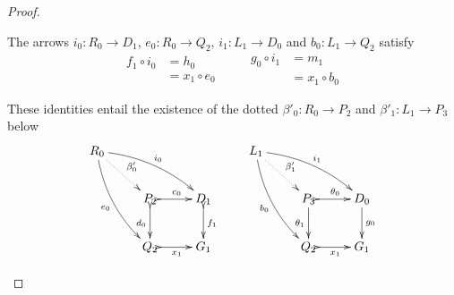 \begin{proof}
\begin{enumerate}
		The arrows $i_0\colon R_0\to D_1$,
		$e_0\colon R_0\to Q_2$, $i_1\colon L_1\to D_0$ and $b_0\colon L_1 \to Q_2$ satisfy
		\[\begin{split}
		f_1\circ i_0  &= h_0 \\&=x_1\circ e_0 
		\end{split}
		\qquad \begin{split}
		g_0\circ i_1 &= m_1 \\&= x_1 \circ b_0 
		\end{split}
		\]
		
		These identities entail the existence of the dotted
		$\beta'_0\colon R_0\to P_2$ and $\beta'_1\colon L_1\to P_3$ below
		\[\xymatrix{R_0 \ar@{.>}[dr]^{\beta'_0} \ar@/^.3cm/[drr]^{i_0}
			\ar@/_.3cm/[ddr]_{e_0} &&& L_1 \ar@{.>}[dr]^{\beta'_1} \ar@/^.3cm/[drr]^{i_1}
			\ar@/_.3cm/[ddr]_{b_0}\\ &P_2 \ar@{>->}[r]^{c_0} \ar@{>->}[d]_{d_0}& D_1
			\ar@{>->}[d]^{f_1} & &P_3 \ar@{>->}[r]^{\theta_0} \ar[d]_{\theta_1}& D_0 \ar[d]^{g_0}\\ &Q_2\ar@{>->}[r]_{x_1} & G_1 & &Q_2\ar@{>->}[r]_{x_1} & G_1}\]
		

\end{enumerate}
\end{proof}
